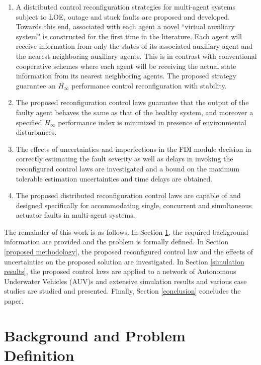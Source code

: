 \documentclass[12pt,draftcls,onecolumn]{IEEEtran}
\begin{document}
 \begin{enumerate}
 	\item [1)] A distributed control reconfiguration strategies for multi-agent systems subject to  LOE, outage and stuck faults are proposed and developed. Towards this end, associated with each agent a novel ``virtual auxiliary system'' is constructed for the first time in the literature. Each agent will receive information from {only} the states of its associated auxiliary agent and the nearest neighboring auxiliary agents. This is in contrast with conventional cooperative schemes where each agent will be receiving the actual state information from its nearest neighboring agents. The proposed strategy guarantee an $H_\infty$ performance control reconfiguration with stability.
\item [2)] The proposed  reconfiguration control  laws  guarantee that 
	the output of the faulty agent behaves the same  as that of the healthy system, and  moreover a specified $H_{\infty}$ performance index  is minimized  in presence of environmental disturbances.
 	\item [3)] The effects of  uncertainties and imperfections in the FDI module decision in correctly estimating the fault severity as well as delays in invoking the reconfigured control laws are investigated and a bound on the maximum tolerable estimation uncertainties and time delays are obtained.
 	\item [4)] The proposed distributed  reconfiguration control laws are capable of and designed specifically for accommodating single, concurrent and simultaneous actuator faults in multi-agent systems.
 \end{enumerate}
The remainder of this work is as follows. In Section \ref{section2}, the required background information are provided and the problem is formally defined. In Section \ref{proposed methodology}, the proposed reconfigured control law and the effects of uncertainties on the proposed solution are investigated. In Section \ref{simulation results}, the proposed control laws are applied to a network of Autonomous  Underwater Vehicles (AUV)s and extensive simulation results and various case studies are studied and presented. Finally, Section  \ref{conclusion} concludes the paper.
\section{ Background and Problem Definition}\label{section2}
\end{document}
